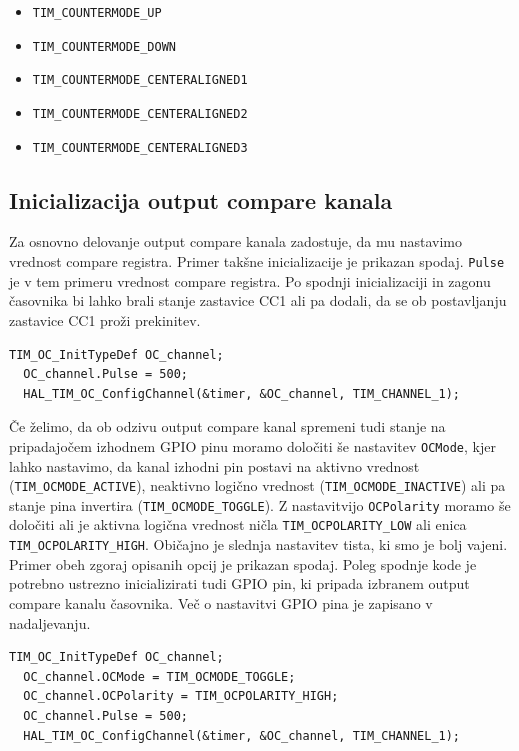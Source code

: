 \documentclass[12pt,letterpaper]{article}
\begin{document}
\begin{itemize}
    \item \texttt{TIM\_COUNTERMODE\_UP}
    \item \texttt{TIM\_COUNTERMODE\_DOWN}
    \item \texttt{TIM\_COUNTERMODE\_CENTERALIGNED1}
    \item \texttt{TIM\_COUNTERMODE\_CENTERALIGNED2}
    \item \texttt{TIM\_COUNTERMODE\_CENTERALIGNED3}
\end{itemize}

\subsection*{Inicializacija output compare kanala}

Za osnovno delovanje output compare kanala zadostuje, da mu nastavimo vrednost compare registra. Primer takšne inicializacije je prikazan spodaj. \texttt{Pulse} je v tem primeru vrednost compare registra. Po spodnji inicializaciji in zagonu časovnika bi lahko brali stanje zastavice CC1 ali pa dodali, da se ob postavljanju zastavice CC1 proži prekinitev.

\begin{center}
\begin{lstlisting}[style=CStyle]
  TIM_OC_InitTypeDef OC_channel;
  OC_channel.Pulse = 500;
  HAL_TIM_OC_ConfigChannel(&timer, &OC_channel, TIM_CHANNEL_1);
\end{lstlisting}
\end{center}

Če želimo, da ob odzivu output compare kanal spremeni tudi stanje na pripadajočem izhodnem GPIO pinu moramo določiti še nastavitev \texttt{OCMode}, kjer lahko nastavimo, da kanal izhodni pin postavi na aktivno vrednost (\texttt{TIM\_OCMODE\_ACTIVE}), neaktivno logično vrednost (\texttt{TIM\_OCMODE\_INACTIVE}) ali pa stanje pina invertira (\texttt{TIM\_OCMODE\_TOGGLE}). Z nastavitvijo \texttt{OCPolarity} moramo še določiti ali je aktivna logična vrednost ničla \texttt{TIM\_OCPOLARITY\_LOW} ali enica \texttt{TIM\_OCPOLARITY\_HIGH}. Običajno je slednja nastavitev tista, ki smo je bolj vajeni. Primer obeh zgoraj opisanih opcij je prikazan spodaj. Poleg spodnje kode je potrebno ustrezno inicializirati tudi GPIO pin, ki pripada izbranem output compare kanalu časovnika. Več o nastavitvi GPIO pina je zapisano v nadaljevanju.

\begin{center}
\begin{lstlisting}[style=CStyle]
  TIM_OC_InitTypeDef OC_channel;
  OC_channel.OCMode = TIM_OCMODE_TOGGLE;
  OC_channel.OCPolarity = TIM_OCPOLARITY_HIGH;
  OC_channel.Pulse = 500;
  HAL_TIM_OC_ConfigChannel(&timer, &OC_channel, TIM_CHANNEL_1);
\end{lstlisting}
\end{center}
\end{document}
